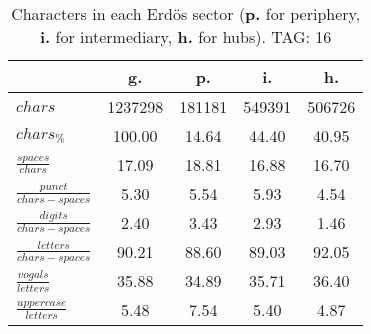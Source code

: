 \begin{table}[h!]
\begin{center}
\begin{tabular}{| l | c | c | c | c |}\hline
 & g. & p. & i. & h. \\\hline
$chars$ & 1237298  & 181181  & 549391  & 506726 \\\hline
$chars_{\%}$ & 100.00  & 14.64  & 44.40  & 40.95 \\\hline
$\frac{spaces}{chars}$ & 17.09  & 18.81  & 16.88  & 16.70 \\\hline
$\frac{punct}{chars-spaces}$ & 5.30  & 5.54  & 5.93  & 4.54 \\\hline
$\frac{digits}{chars-spaces}$ & 2.40  & 3.43  & 2.93  & 1.46 \\\hline
$\frac{letters}{chars-spaces}$ & 90.21  & 88.60  & 89.03  & 92.05 \\\hline
$\frac{vogals}{letters}$ & 35.88  & 34.89  & 35.71  & 36.40 \\\hline
$\frac{uppercase}{letters}$ & 5.48  & 7.54  & 5.40  & 4.87 \\\hline
\end{tabular}
\caption{Characters in each Erd\"os sector ({{\bf p.}} for periphery, {{\bf i.}} for intermediary, 
    {{\bf h.}} for hubs). TAG: 16}
\end{center}
\end{table}